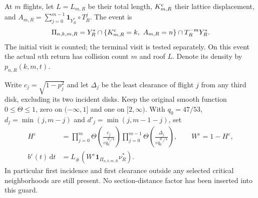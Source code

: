 \documentclass[11pt,reqno]{amsart}
\numberwithin{equation}{section}
\theoremstyle{definition}
\theoremstyle{remark}\newtheorem{remark}[theorem]{Remark}
\newcommand{\one}{\mathbf1}\newcommand{\dd}{\,\mathrm d}
\begin{document}
At $m$ flights, let $L=L_{m,R}$ be their total length,
$K^{\rm c}_{m,R}$ their lattice displacement, and
$A_{m,R}=\sum_{j=0}^{m-1}\one_{Y_R^*}\circ T_R^j$. The event is
\begin{equation}\label{eq:v76-event}
 \Pi_{n,k,m,R}=Y_R^*\cap\{K^{\rm c}_{m,R}=k,\ A_{m,R}=n\}
                         \cap T_R^{-m}Y_R^*.
\end{equation}
The initial visit is counted; the terminal visit is tested separately.
On this event the actual $n$th return has collision count $m$ and
roof $L$. Denote its density by $p_{n,R}(k,m,t)$.

Write $c_j=\sqrt{1-p_j^2}$ and let $\Delta_j$ be the least clearance
of flight $j$ from any third disk, excluding its two incident disks.
Keep the original smooth function $0\le\Theta\le1$, zero on
$(-\infty,1]$ and one on $[2,\infty)$. With $q_0=47/53$,
$d_j=\min(j,m-j)$ and $d'_j=\min(j,m-1-j)$, set
\begin{align}
 H^\varepsilon&=
 \prod_{j=0}^{m}\Theta\!\left(\frac{c_j}{\varepsilon q_0^{d_j/4}}\right)
 \prod_{j=0}^{m-1}\Theta\!\left(\frac{\Delta_j}{\varepsilon q_0^{d'_j/4}}\right),
 \qquad W^\varepsilon=1-H^\varepsilon,\label{eq:v76-guard}\\
 b^\varepsilon(t)\dd t
   &=L_\#(W^\varepsilon\one_{\Pi_{n,k,m,R}}\nu_R^*).
 \label{eq:v76-source}
\end{align}
In particular first incidence and first clearance outside any selected
critical neighborhoods are still present. No section-distance factor
has been inserted into this guard.
\end{document}
